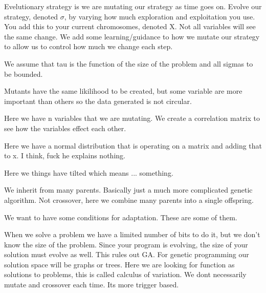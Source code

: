 \documentclass[12pt]{article}
\begin{document}
	




Evelutionary strategy is we are mutating our strategy as time goes on. Evolve our strategy, denoted $\sigma$, by varying how much exploration and exploitation you use. You add this to your current chromosomes, denoted X. Not all variables will see the same change. We add some learning/guidance to how we mutate our strategy to allow us to control how much we change each step. 




We assume that tau is the function of the size of the problem and all sigmas to be bounded.


Mutants have the same likilihood to be created, but some variable are more important than others so the data generated is not circular.


Here we have n variables that we are mutating. We create a correlation matrix to see how the variables effect each other. 


Here we have a normal distribution that is operating on a matrix and adding that to x. I think, fuck he explains nothing.


Here we things have tilted which means ... something.


We inherit from many parents. Basically just a much more complicated genetic algorithm. Not crossover, here we combine many parents into a single offspring.













We want to have some conditions for adaptation. These are some of them.


When we solve a problem we have a limited number of bits to do it, but we don't know the size of the problem. Since your program is evolving, the size of your solution must evolve as well. This rules out GA. For genetic programming our solution space will be graphs or trees. Here we are looking for function as solutions to problems, this is called calculus of variation. We dont necessarily mutate and crossover each time. Its more trigger based.
\end{document}
